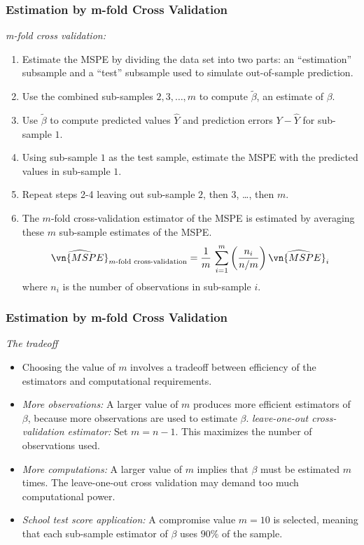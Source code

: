 \begin{frame}
\frametitle{Estimation by m-fold Cross Validation}
\emph{m-fold cross validation:} 
\begin{enumerate}
\item 
Estimate the MSPE by dividing the data set into two parts: an ``estimation'' subsample and a ``test'' subsample used to simulate out-of-sample prediction. 
\item Use the combined sub-samples $2,3,\ldots,m$ to compute $\tilde{\beta}$, an estimate of $\beta$.
\item Use $\tilde{\beta}$ to compute predicted values $\hat{Y}$ and prediction errors $Y-\hat{Y}$ for sub-sample $1$. 
\item Using sub-sample $1$ as the test sample, estimate the MSPE with the predicted values in sub-sample $1$. 
\item Repeat steps 2-4 leaving out sub-sample $2$, then $3$, \ldots, then $m$. 
\item The $m$-fold cross-validation estimator of the MSPE is estimated by averaging these $m$ sub-sample estimates of the MSPE. 
\begin{align*}
\widehat{\vn{MSPE}}_{\text{$m$-fold cross-validation}} = \frac{1}{m}\, 
    \sum_{i=1}^{m} \left(\frac{n_{i}}{n/m}\right) \widehat{\vn{MSPE}_{i}}
\end{align*}
where $n_{i}$ is the number of observations in sub-sample $i$. 
\end{enumerate}
\end{frame}


\begin{frame}
\frametitle{Estimation by m-fold Cross Validation}
\emph{The tradeoff}
\begin{itemize}
\item Choosing the value of $m$ involves a tradeoff between efficiency of the estimators and computational requirements. 
\item \emph{More observations:}
A larger value of $m$ produces more efficient estimators of $\beta$, because more observations are used to estimate $\beta$. \emph{leave-one-out cross-validation estimator:} Set $m=n-1$. This maximizes the number of observations used.
\item \emph{More computations:}
A larger value of $m$ implies that $\beta$ must be estimated $m$ times. The leave-one-out cross validation may demand too much computational power. 
\item \emph{School test score application:} 
A compromise value $m=10$ is selected, meaning that each sub-sample estimator of $\beta$ uses $90\%$ of the sample. 
\end{itemize}
\end{frame}
